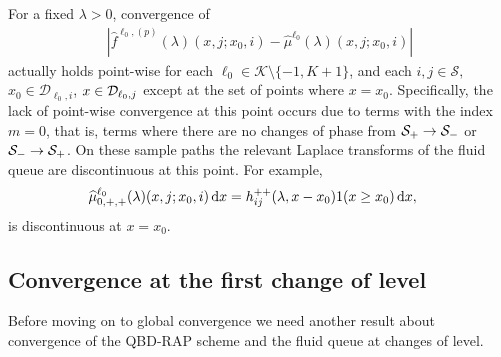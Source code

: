 \begin{rem}\label{rem: point wies}
	For a fixed \(\lambda > 0\), convergence of 
	\begin{align}
		\left|\widehat f^{\ell_0,(p)}(\lambda)(x,j;x_0,i) - \widehat \mu^{\ell_0}(\lambda)( x,j; x_0,i) \right|
	\end{align}
	actually holds point-wise for each \(\ell_0\in\mathcal K\setminus\{-1,K+1\}\), and each \(i,j\in\mathcal S,\) \(x_0\in\mathcal D_{\ell_0,i}\), \(x\in\mathcal{D}_{\ell_0,j}\) except at the set of points where \(x=x_0\). Specifically, the lack of point-wise convergence at this point occurs due to terms with the index \(m=0\), that is, terms where there are no changes of phase from \(\mathcal{S}_+\to\mathcal{S}_-\) or \(\mathcal{S}_-\to \mathcal{S}_+\). On these sample paths the relevant Laplace transforms of the fluid queue are discontinuous at this point. For example, 
	\begin{align*}
		\widehat \mu^{\ell_0}_{0,+,+}(\lambda)( x,j;x_0,i) \, \mathrm{d} x&= h_{ij}^{++}(\lambda,x-x_0)1(x\geq x_0)\, \mathrm{d} x,
	\end{align*}
	is discontinuous at \(x=x_0\). %
\end{rem}

\subsection{Convergence at the first change of level} Before moving on to global convergence we need another result about convergence of the QBD-RAP scheme and the fluid queue at changes of level. 

